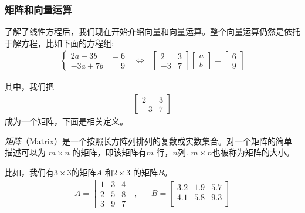 \documentclass[12pt]{article}
\numberwithin{figure}{section}
\numberwithin{equation}{section}
\begin{document}
\subsubsection{矩阵和向量运算}

了解了线性方程后，我们现在开始介绍向量和向量运算。整个向量运算仍然是依托于解方程，比如下面的方程组:
\begin{align*}
	\begin{cases}
		2a + 3b & = 6 \\
		-3a + 7b & = 9 
	\end{cases} \ \ \ \Leftrightarrow \ \ \ \begin{bmatrix}
		2 & 3 \\
		-3 & 7
	\end{bmatrix} \begin{bmatrix}
		a \\
		b
	\end{bmatrix} = \begin{bmatrix}
		6 \\
		9 
	\end{bmatrix}
\end{align*}

其中，我们把
\begin{align*}
	\begin{bmatrix}
		2 & 3 \\
		-3 & 7 
	\end{bmatrix}
\end{align*}
成为一个矩阵，下面是相关定义。


\begin{definition}
	\textit{矩阵}（Matrix）是一个按照长方阵列排列的复数或实数集合。对一个矩阵的简单描述可以为 $m \times n$ 的矩阵，即该矩阵有$m$ 行，$n$列. $m \times n$也被称为矩阵的大小。
\end{definition}
\begin{example}
比如，我们有$3 \times 3 $的矩阵$A$ 和$2 \times 3$ 的矩阵$B$。
\begin{align*}
	 A = \begin{bmatrix}
	1 & 3 & 4 \\
	2 & 5 & 8 \\
	3 & 9 & 7
\end{bmatrix}, & & B = \begin{bmatrix}
	3.2 & 1.9 & 5.7 \\
	4.1 & 5.8 & 9.3 \\
\end{bmatrix}
\end{align*}	
\end{example}
\end{document}

